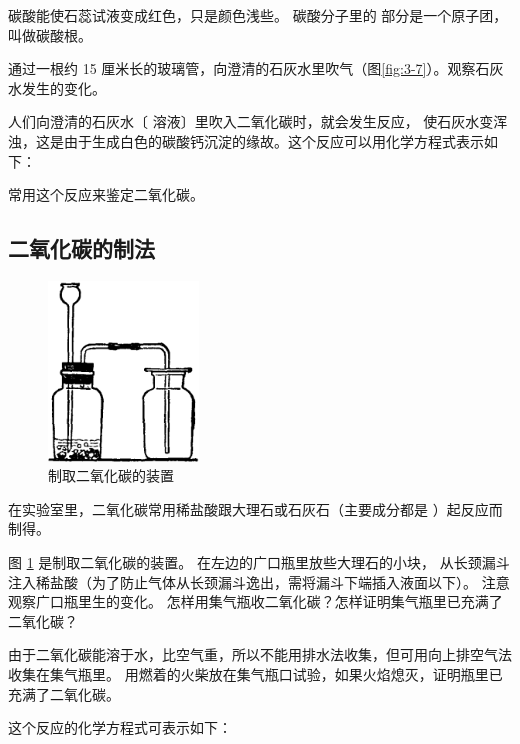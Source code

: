 碳酸能使石蕊试液变成红色，只是颜色浅些。
碳酸分子里的  部分是一个原子团，叫做碳酸根。

\begin{shiyan}
    通过一根约 15 厘米长的玻璃管，向澄清的石灰水里吹气（图\ref{fig:3-7}）。观察石灰水发生的变化。
\end{shiyan}


人们向澄清的石灰水〔 溶液〕里吹入二氧化碳时，就会发生反应，
使石灰水变浑浊，这是由于生成白色的碳酸钙沉淀的缘故。这个反应可以用化学方程式表示如下：
\begin{fangchengshi}
\end{fangchengshi}

常用这个反应来鉴定二氧化碳。


\subsection{二氧化碳的制法}

\begin{figure}
    \centering
    \includegraphics[width=4cm]{../pic/czhx1-ch3-8}
    \caption{制取二氧化碳的装置}\label{fig:3-8}
\end{figure}

在实验室里，二氧化碳常用稀盐酸跟大理石或石灰石（主要成分都是 ）起反应而制得。

\begin{shiyan}
    图 \ref{fig:3-8} 是制取二氧化碳的装置。
    在左边的广口瓶里放些大理石的小块，
    从长颈漏斗注入稀盐酸（为了防止气体从长颈漏斗逸出，需将漏斗下端插入液面以下）。
    注意观察广口瓶里生的变化。
    怎样用集气瓶收二氧化碳？怎样证明集气瓶里已充满了二氧化碳？
\end{shiyan}


由于二氧化碳能溶于水，比空气重，所以不能用排水法收集，但可用向上排空气法收集在集气瓶里。
用燃着的火柴放在集气瓶口试验，如果火焰熄灭，证明瓶里已充满了二氧化碳。

这个反应的化学方程式可表示如下：
\begin{fangchengshi}
\end{fangchengshi}

